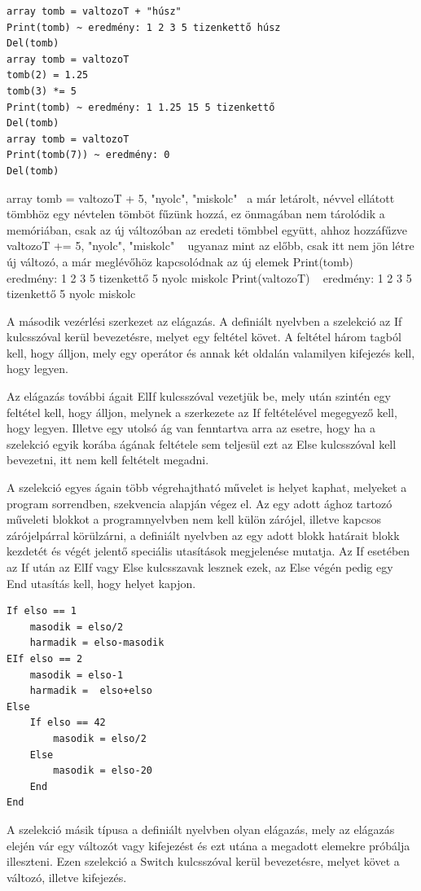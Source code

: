 \begin{verbatim}
array tomb = valtozoT + "húsz"
Print(tomb) ~ eredmény: 1 2 3 5 tizenkettő húsz
Del(tomb)
array tomb = valtozoT
tomb(2) = 1.25
tomb(3) *= 5
Print(tomb) ~ eredmény: 1 1.25 15 5 tizenkettő
Del(tomb)
array tomb = valtozoT
Print(tomb(7)) ~ eredmény: 0
Del(tomb)
\end{verbatim}

array tomb = valtozoT + {5, "nyolc", "miskolc"} ~a már letárolt, névvel ellátott tömbhöz egy névtelen tömböt fűzünk hozzá, ez önmagában nem tárolódik a memóriában, csak az új változóban az eredeti tömbbel együtt, ahhoz hozzáfűzve
valtozoT += {5, "nyolc", "miskolc"} ~ ugyanaz mint az előbb, csak itt nem jön létre új változó, a már meglévőhöz kapcsolódnak az új elemek
Print(tomb) ~ eredmény: 1 2 3 5 tizenkettő 5 nyolc miskolc
Print(valtozoT) ~ eredmény: 1 2 3 5 tizenkettő 5 nyolc miskolc

A második vezérlési szerkezet az elágazás. A definiált nyelvben a szelekció az If kulcsszóval kerül bevezetésre, melyet egy feltétel követ. A feltétel három tagból kell, hogy álljon, mely egy operátor és annak két oldalán valamilyen kifejezés kell, hogy legyen.

Az elágazás további ágait ElIf kulcsszóval vezetjük be, mely után szintén egy feltétel kell, hogy álljon, melynek a szerkezete az If feltételével megegyező kell, hogy legyen. Illetve egy utolsó ág van fenntartva arra az esetre, hogy ha a szelekció egyik korába ágának feltétele sem teljesül ezt az Else kulcsszóval kell bevezetni, itt nem kell feltételt megadni.

A szelekció egyes ágain több végrehajtható művelet is helyet kaphat, melyeket a program sorrendben, szekvencia alapján végez el. Az egy adott ághoz tartozó műveleti blokkot a programnyelvben nem kell külön zárójel, illetve kapcsos zárójelpárral körülzárni, a definiált nyelvben az egy adott blokk határait blokk kezdetét és végét jelentő speciális utasítások megjelenése mutatja. Az If esetében az If után az ElIf vagy Else kulcsszavak lesznek ezek, az Else végén pedig egy End utasítás kell, hogy helyet kapjon.

\begin{verbatim}
If elso == 1
	masodik = elso/2
	harmadik = elso-masodik
EIf elso == 2
	masodik = elso-1
	harmadik =  elso+elso
Else
	If elso == 42
		masodik = elso/2
	Else
		masodik = elso-20
	End
End
\end{verbatim}

A szelekció másik típusa a definiált nyelvben olyan elágazás, mely az elágazás elején vár egy változót vagy kifejezést és ezt utána a megadott elemekre próbálja illeszteni. Ezen szelekció a Switch kulcsszóval kerül bevezetésre, melyet követ a változó, illetve kifejezés.

